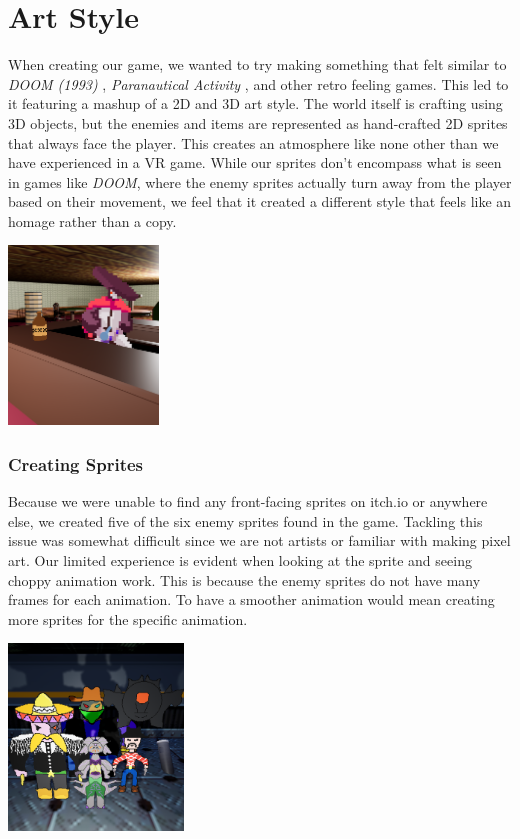 \documentclass{sigchi}
\begin{document}
\section{Art Style}
When creating our game, we wanted to try making something that felt similar to \textit{DOOM (1993)} \cite{doom}, \textit{Paranautical Activity} \cite{paranautical}, and other retro feeling games. This led to it featuring a mashup of a 2D and 3D art style. The world itself is crafting using 3D objects, but the enemies and items are represented as hand-crafted 2D sprites that always face the player. This creates an atmosphere like none other than we have experienced in a VR game. While our sprites don’t encompass what is seen in games like \textit{DOOM}, where the enemy sprites actually turn away from the player based on their movement, we feel that it created a different style that feels like an homage rather than a copy.
\begin{center}
    \includegraphics[width=0.3\textwidth]{2D.png}
    \label{fig:2D}
\end{center}

\subsubsection*{Creating Sprites}
Because we were unable to find any front-facing sprites on itch.io \cite{itch} or anywhere else, we created five of the six enemy sprites found in the game. Tackling this issue was somewhat difficult since we are not artists or familiar with making pixel art. Our limited experience is evident when looking at the sprite and seeing choppy animation work. This is because the enemy sprites do not have many frames for each animation. To have a smoother animation would mean creating more sprites for the specific animation. 
\begin{center}
    \includegraphics[width=0.35\textwidth]{sprite.png}
    \label{fig:Sprites}
\end{center}
\end{document}
